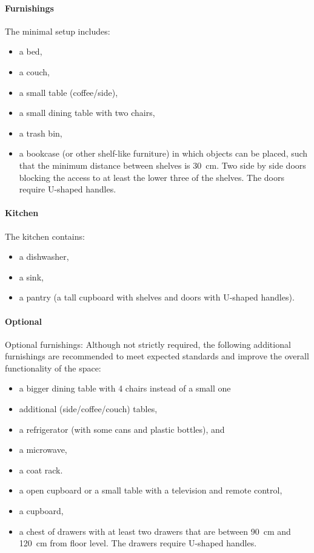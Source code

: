 \paragraph{Furnishings} The minimal setup includes:
\begin{itemize}
    \item a bed,
    \item a couch,
    \item a small table (coffee/side),
    \item a small dining table with two chairs,
    \item a trash bin,
    \item a bookcase (or other shelf-like furniture) in which objects can be placed, such that the minimum distance between shelves is \qty{30}{\centi\meter}. Two side by side doors blocking the access to at least the lower three of the shelves. The doors require U-shaped handles.
\end{itemize}

\paragraph{Kitchen} The kitchen contains:
\begin{itemize}
    \item a dishwasher,
    \item a sink,
    \item a pantry (a tall cupboard with shelves and doors with U-shaped handles).
\end{itemize}

\paragraph{Optional} Optional furnishings:
Although not strictly required, the following additional furnishings are recommended to meet expected standards and improve the overall functionality of the space:
\begin{itemize}
    \item a bigger dining table with 4 chairs instead of a small one
    \item additional (side/coffee/couch) tables,
    \item a refrigerator (with some cans and plastic bottles), and
    \item a microwave,
    \item a coat rack.
    \item a open cupboard or a small table with a television and remote control,
    \item a cupboard,
    \item a chest of drawers with at least two drawers that are between \qty{90}{\centi\meter} and \qty{120}{\centi\meter} from floor level. The drawers require U-shaped handles.
\end{itemize}


